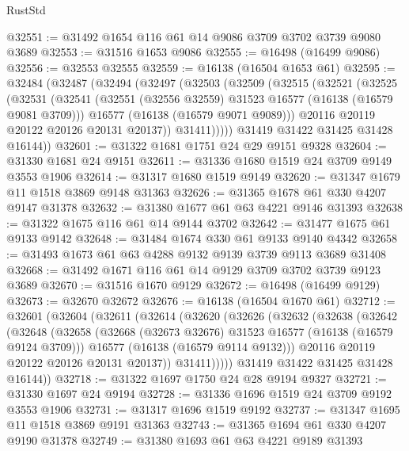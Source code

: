 \begin{lexlean}{RustStd}
\begin{coremodule}
@32551 := @31492 @1654 @116 @61 @14 @9086 @3709 @3702 @3739 @9080 @3689
@32553 := @31516 @1653 @9086
@32555 := @16498 (@16499 @9086)
@32556 := @32553 @32555
@32559 := @16138 (@16504 @1653 @61)
@32595 := @32484
    (@32487
      (@32494
        (@32497
          (@32503
            (@32509
              (@32515
                (@32521
                  (@32525
                    (@32531
                      (@32541
                        (@32551 (@32556 @32559) @31523 @16577 (@16138 (@16579 @9081 @3709)))
                        @16577
                        (@16138 (@16579 @9071 @9089)))
                      @20116
                      @20119
                      @20122
                      @20126
                      @20131
                      @20137))
                  @31411)))))
        @31419
        @31422
        @31425
        @31428
        @16144))
@32601 := @31322 @1681 @1751 @24 @29 @9151 @9328
@32604 := @31330 @1681 @24 @9151
@32611 := @31336 @1680 @1519 @24 @3709 @9149 @3553 @1906
@32614 := @31317 @1680 @1519 @9149
@32620 := @31347 @1679 @11 @1518 @3869 @9148 @31363
@32626 := @31365 @1678 @61 @330 @4207 @9147 @31378
@32632 := @31380 @1677 @61 @63 @4221 @9146 @31393
@32638 := @31322 @1675 @116 @61 @14 @9144 @3702
@32642 := @31477 @1675 @61 @9133 @9142
@32648 := @31484 @1674 @330 @61 @9133 @9140 @4342
@32658 := @31493 @1673 @61 @63 @4288 @9132 @9139 @3739 @9113 @3689 @31408
@32668 := @31492 @1671 @116 @61 @14 @9129 @3709 @3702 @3739 @9123 @3689
@32670 := @31516 @1670 @9129
@32672 := @16498 (@16499 @9129)
@32673 := @32670 @32672
@32676 := @16138 (@16504 @1670 @61)
@32712 := @32601
    (@32604
      (@32611
        (@32614
          (@32620
            (@32626
              (@32632
                (@32638
                  (@32642
                    (@32648
                      (@32658
                        (@32668 (@32673 @32676) @31523 @16577 (@16138 (@16579 @9124 @3709)))
                        @16577
                        (@16138 (@16579 @9114 @9132)))
                      @20116
                      @20119
                      @20122
                      @20126
                      @20131
                      @20137))
                  @31411)))))
        @31419
        @31422
        @31425
        @31428
        @16144))
@32718 := @31322 @1697 @1750 @24 @28 @9194 @9327
@32721 := @31330 @1697 @24 @9194
@32728 := @31336 @1696 @1519 @24 @3709 @9192 @3553 @1906
@32731 := @31317 @1696 @1519 @9192
@32737 := @31347 @1695 @11 @1518 @3869 @9191 @31363
@32743 := @31365 @1694 @61 @330 @4207 @9190 @31378
@32749 := @31380 @1693 @61 @63 @4221 @9189 @31393

\end{coremodule}
\end{lexlean}
